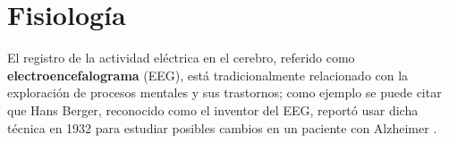 %



\section{Fisiología}

El registro de la actividad eléctrica en el cerebro, referido como \textbf{electroencefalograma} 
(EEG), está tradicionalmente relacionado con la exploración de procesos mentales y sus trastornos; 
como ejemplo se puede citar que Hans Berger, reconocido como el inventor del EEG, reportó usar 
dicha técnica en 1932 para estudiar posibles cambios en un paciente con Alzheimer 
\cite{historia_eeg}.
%

